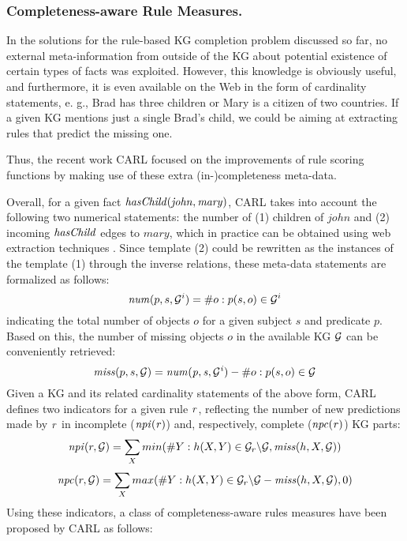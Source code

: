 \subsubsection{Completeness-aware Rule Measures.}  
In the solutions for the rule-based KG completion problem discussed so far, no external meta-information from outside of the KG about potential existence of certain types of facts was exploited. However, this knowledge is obviously useful, and furthermore, it is even available on the Web
in the form of cardinality statements, e. g., Brad has three children or Mary is a citizen of two countries. If a given KG mentions just a single Brad's child, we could be aiming at extracting rules that predict the missing
one.

Thus, the recent work CARL \cite{carl} focused on the improvements of rule scoring functions by making use of these extra (in-)completeness meta-data.

Overall, for a given fact $\mathit{hasChild(john,  mary)}$, CARL takes into account the following two numerical statements: the number of (1) children of $john$ and (2) incoming $\mathit{hasChild}$ edges to $mary$, which in practice can be obtained using web extraction techniques \cite{cardinality-extraction-iswc-2016}. Since template (2) could be rewritten as the instances of the template (1) through the inverse relations, these meta-data statements are formalized as follows:
\[\mathit{num}(p,s, \mathcal{G}^i) = \# o : p(s,o) \in \mathcal{G}^i\]
indicating the total number of objects $o$ for a given subject $s$ and predicate $p$. Based on this, the number of missing objects $o$ in the available KG $\mathcal{G}$ can be conveniently  retrieved:
\[\mathit{miss}(p,s,\mathcal{G}) = \mathit{num(p,s,\mathcal{G}^i)} - \#o : p(s,o) \in \mathcal{G}\]
Given a KG and its related cardinality statements of the above form, CARL defines two indicators for a given rule $\mathit{r}$, reflecting the number of new 
predictions made by $\mathit{r}$ in incomplete ($\mathit{npi(r)}$) and, respectively, complete ($\mathit{npc(r)}$) KG parts:
\begin{align*}
\mathit{npi}(r, \mathcal{G}) = \sum_X min(\#Y: h(X,Y)\in \mathcal{G}_r\backslash \mathcal{G}, \mathit{miss}(h,X,\mathcal{G}))
\end{align*}
\vspace{-\topsep}
\vspace{-\topsep}
\begin{align*}
\mathit{npc}(r, \mathcal{G}) = \sum_X max(\#Y: h(X,Y)\in\mathcal{G}_r\backslash \mathcal{G} - \mathit{miss}(h,X,\mathcal{G}), 0)
\end{align*}
Using these indicators, a class of completeness-aware rules measures have been proposed by CARL as follows:
% 

